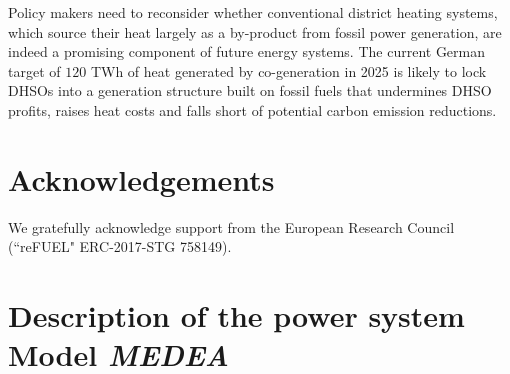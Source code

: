 \documentclass[preprint, 12pt, authoryear]{elsarticle}
\begin{document}
Policy makers need to reconsider whether conventional district heating systems, which source their heat largely as a by-product from fossil power generation, are indeed a promising component of future energy systems. The current German target of $120$ TWh of heat generated by co-generation in 2025 \citep{KWKG2016} is likely to lock DHSOs into a generation structure built on fossil fuels that undermines DHSO profits, raises heat costs and falls short of potential carbon emission reductions.
\section*{Acknowledgements}
We gratefully acknowledge support from the European Research Council (“reFUEL" ERC-2017-STG 758149).

\newpage



\newpage
\appendix
{}
\section{Description of the power system Model \emph{MEDEA}} \label{sec_datref} \label{Apndx2}
\end{document}
